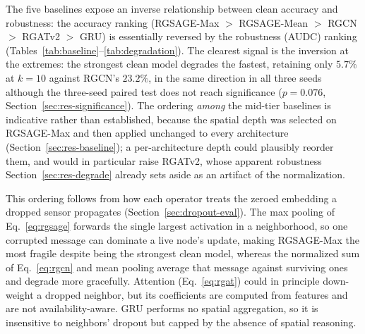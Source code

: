 \documentclass[3p,times,procedia]{elsarticle}
\begin{document}
The five baselines expose an inverse relationship between clean accuracy and robustness: the accuracy ranking (RGSAGE-Max $>$ RGSAGE-Mean $>$ RGCN $>$ RGATv2 $>$ GRU) is essentially reversed by the robustness (AUDC) ranking (Tables~\ref{tab:baseline}--\ref{tab:degradation}). The clearest signal is the inversion at the extremes: the strongest clean model degrades the fastest, retaining only $5.7\%$ at $k=10$ against RGCN's $23.2\%$, in the same direction in all three seeds although the three-seed paired test does not reach significance ($p=0.076$, Section~\ref{sec:res-significance}). The ordering \emph{among} the mid-tier baselines is indicative rather than established, because the spatial depth was selected on RGSAGE-Max and then applied unchanged to every architecture (Section~\ref{sec:res-baseline}); a per-architecture depth could plausibly reorder them, and would in particular raise RGATv2, whose apparent robustness Section~\ref{sec:res-degrade} already sets aside as an artifact of the normalization.

This ordering follows from how each operator treats the zeroed embedding a dropped sensor propagates (Section~\ref{sec:dropout-eval}). The max pooling of Eq.~\eqref{eq:rgsage} forwards the single largest activation in a neighborhood, so one corrupted message can dominate a live node's update, making RGSAGE-Max the most fragile despite being the strongest clean model, whereas the normalized sum of Eq.~\eqref{eq:rgcn} and mean pooling average that message against surviving ones and degrade more gracefully. Attention (Eq.~\eqref{eq:rgat}) could in principle down-weight a dropped neighbor, but its coefficients are computed from features and are not availability-aware. GRU performs no spatial aggregation, so it is insensitive to neighbors' dropout but capped by the absence of spatial reasoning.
\end{document}
